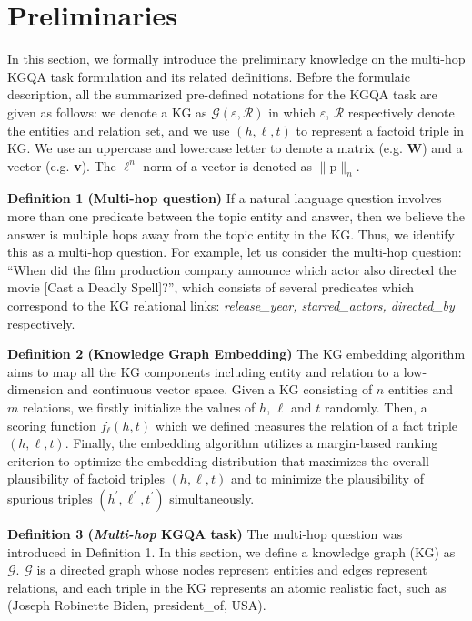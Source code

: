 \documentclass[pdflatex,sn-mathphys]{sn-jnl}%
\theoremstyle{thmstyleone}%
\theoremstyle{thmstyletwo}%
\theoremstyle{thmstylethree}%
\begin{document}
\section{Preliminaries}
\label{preliminary}
In this section, we formally introduce the preliminary knowledge \cite{yunshilan2021surveyQA,fu2020surveyQA} on the multi-hop KGQA task formulation and its related definitions. Before the formulaic description, all the summarized pre-defined notations for the KGQA task are given as follows: we denote a KG as $\mathcal{G}(\varepsilon, \mathcal{R})$ in which $\varepsilon$, $\mathcal{R}$ respectively denote the entities and relation set, and we use $(h, \ell, t)$ to represent a factoid triple in KG. We use an uppercase and lowercase letter to denote a matrix (e.g. \textbf{W}) and a vector (e.g. \textbf{v}). The $\ell^{n}$ norm of a vector is denoted as $\|\mathrm{p}\|_{n}$.

\textbf{Definition 1 (Multi-hop question)} \cite{apoorv2020embedKGQA,fu2020surveyQA,yunshilan2021surveyQA} If a natural language question involves more than one predicate between the topic entity and answer, then we believe the answer is multiple hops away from the topic entity in the KG. Thus, we identify this as a multi-hop question. For example, let us consider the multi-hop question: ``When did the film production company announce which actor also directed the movie [Cast a Deadly Spell]?'', which consists of several predicates which correspond to the KG relational links: \textit{release\_year, starred\_actors, directed\_by} respectively.

\textbf{Definition 2 (Knowledge Graph  Embedding)} \cite{quan2017surveyofKGE} The KG embedding algorithm \cite{huang2019KgeQA,quan2017surveyofKGE} aims to map all the KG components including entity and relation to a low-dimension and continuous vector space. Given a KG consisting of $n$ entities and $m$ relations, we firstly initialize the values of $h$, $\ell$ and $t$ randomly. Then, a scoring function $f_{\ell}(h, t)$ which we defined measures the relation of a fact triple $(h, \ell, t)$. Finally, the embedding algorithm utilizes a margin-based ranking criterion to optimize the embedding distribution that maximizes the overall plausibility of factoid triples $(h, \ell, t)$ and to minimize the plausibility of spurious triples $(h^{\prime}, \ell^{\prime}, t^{\prime})$ simultaneously.

\textbf{Definition 3 (\textit{Multi-hop} KGQA task)} \cite{fu2020surveyQA,yunshilan2021surveyQA}
The multi-hop question was introduced in Definition 1. In this section, we define a knowledge graph (KG) as $\mathcal{G}$. $\mathcal{G}$ is a directed graph whose nodes represent entities and edges represent relations, and each triple in the KG represents an atomic realistic fact, such as (Joseph Robinette Biden, president\_of, USA).
\end{document}
